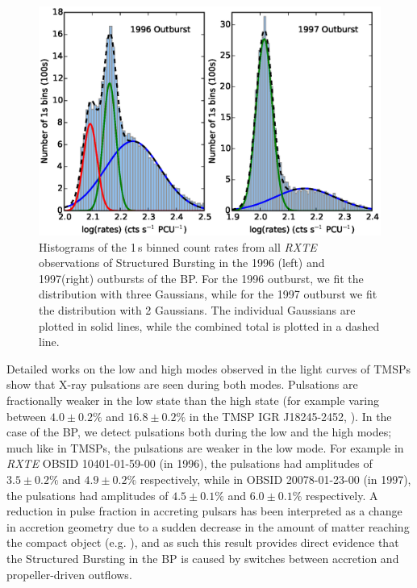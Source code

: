 \begin{figure}
 \centering
 \includegraphics[width=.82\linewidth, trim={1.3cm 0.1cm 1.7cm 1.1cm},clip]{images/hist_bo.eps}
 \caption{\small Histograms of the 1\,s binned count rates from all \textit{RXTE} observations of Structured Bursting in the 1996 (left) and 1997(right) outbursts of the BP. For the 1996 outburst, we fit the distribution with three Gaussians, while for the 1997 outburst we fit the distribution with 2 Gaussians. The individual Gaussians are plotted in solid lines, while the combined total is plotted in a dashed line.}
 \label{fig:bimodal}
\end{figure}

\par Detailed works on the low and high modes observed in the light curves of TMSPs show that X-ray pulsations are seen during both modes. Pulsations are fractionally weaker in the low state than the high state (for example varing between $4.0\pm0.2\%$ and $16.8\pm0.2\%$ in the TMSP IGR J18245-2452, \citealp{Ferrigno_TMSPVar}). In the case of the BP, we detect pulsations both during the low and the high modes; much like in TMSPs, the pulsations are weaker in the low mode. For example in \textit{RXTE} OBSID 10401-01-59-00 (in 1996), the pulsations had amplitudes of $3.5\pm0.2\%$ and $4.9\pm0.2\%$ respectively, while in OBSID 20078-01-23-00 (in 1997), the pulsations had amplitudes of $4.5\pm0.1\%$ and $6.0\pm0.1\%$ respectively. A reduction in pulse fraction in accreting pulsars has been interpreted as a change in accretion geometry due to a sudden decrease in the amount of matter reaching the compact object (e.g. \citealp{Ibragimov_PulseFrac}), and as such this result provides direct evidence that the Structured Bursting in the BP is caused by switches between accretion and propeller-driven outflows.

